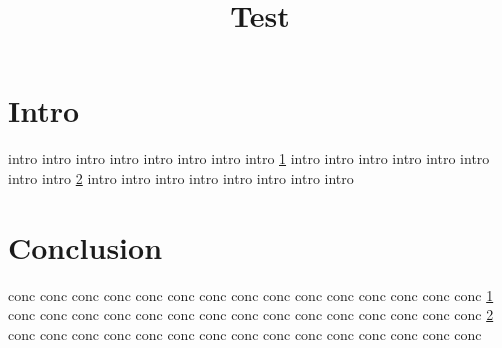 \documentclass[10pt,sigplan]{acmart}
\begin{document}
\title{Test}

\maketitle

\section{Intro}
\label{sec:intro}

intro intro intro intro 
intro intro intro intro
\cref{sec:intro}
intro intro intro intro 
intro intro intro intro
\cref{sec:conc}
intro intro intro intro 
intro intro intro intro

\section{Conclusion}
\label{sec:conc}

conc conc conc conc conc
conc conc conc conc conc
conc conc conc conc conc
\cref{sec:intro}
conc conc conc conc conc
conc conc conc conc conc
conc conc conc conc conc
\cref{sec:conc}
conc conc conc conc conc
conc conc conc conc conc
conc conc conc conc conc
\end{document}

